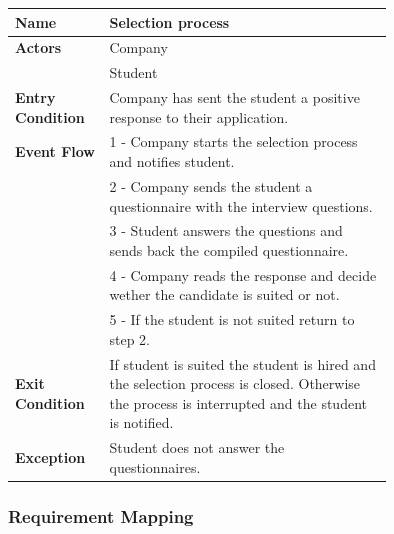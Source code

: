 \documentclass[12pt]{article}
\begin{document}
        \begin{center}
            \begin{longtable}{|l|p{0.75\linewidth}|}
                \hline
                \textbf{Name} & Selection process \\
                \hline
                \textbf{Actors} 
                & Company \\
                & Student \\
                \hline
                \textbf{Entry Condition}
                & Company has sent the student a positive response to their application. \\
                \hline
                \textbf{Event Flow}
                & 1 - Company starts the selection process and notifies student. \\
                & 2 - Company sends the student a questionnaire with the interview questions. \\
                & 3 - Student answers the questions and sends back the compiled questionnaire. \\
                & 4 - Company reads the response and decide wether the candidate is suited or not. \\
                & 5 - If the student is not suited return to step 2. \\
                \hline
                \textbf{Exit Condition}
                & If student is suited the student is hired and the selection process is closed. Otherwise the process is interrupted and the student is notified. \\
                \hline
                \textbf{Exception}
                & Student does not answer the questionnaires. \\
                \hline
            \end{longtable}
        \end{center}

\subsubsection{Requirement Mapping}
\end{document}
